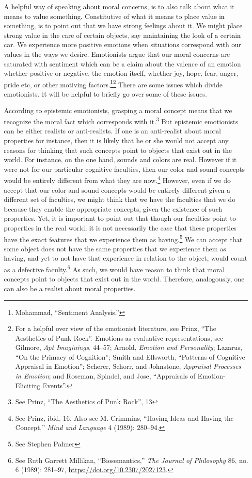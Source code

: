 \documentclass[phdthesis,12pt,final,a4paper]{wuthesis}
\theoremstyle{definition}
\theoremstyle{definition}
\theoremstyle{definition}
\theoremstyle{definition}
\theoremstyle{remark}
\begin{document}
A helpful way of speaking about moral concerns, is to also talk about what it means to value something. Constitutive of what it means to place value in something, is to point out that we have strong feelings about it. We might place strong value in the care of certain objects, say maintaining the look of a certain car. We experience more positive emotions when situations correspond with our values in the ways we desire. Emotionists argue that our moral concerns are saturated with sentiment which can be a claim about the valence of an emotion whether positive or negative, the emotion itself, whether joy, hope, fear, anger, pride etc, or other motiving factors.\footnote{Mohammad, {``Sentiment {Analysis}.''}}\footnote{For a helpful over view of the emotionist literature, see Prinz, {``The {Aesthetics} of {Punk Rock}''}. Emotions as evaluative representations, see Gilmore, \emph{Apt {Imaginings}}, 44--57; Arnold, \emph{Emotion and {Personality}}; Lazarus, {``On the {Primacy} of {Cognition}''}; Smith and Ellsworth, {``Patterns of {Cognitive Appraisal} in {Emotion}''}; Scherer, Schorr, and Johnstone, \emph{Appraisal Processes in Emotion}; and Roseman, Spindel, and Jose, {``Appraisals of Emotion-Eliciting Events''}.} There are some issues which divide emotionists. It will be helpful to briefly go over some of these issues.

According to epistemic emotionists, grasping a moral concept means that we recognize the moral fact which corresponds with it.\footnote{See Prinz, {``The {Aesthetics} of {Punk Rock}''}, 13} But epistemic emotionists can be either realists or anti-realists. If one is an anti-realist about moral properties for instance, then it is likely that he or she would not accept any reasons for thinking that such concepts point to objects that exist out in the world. For instance, on the one hand, sounds and colors are real. However if it were not for our particular cognitive faculties, then our color and sound concepts would be entirely different from what they are now.\footnote{See Prinz, ibid, 16. Also see M. Crimmins, {``Having Ideas and Having the Concept,''} \emph{Mind and Language} 4 (1989): 280--94.} However, even if we do accept that our color and sound concepts would be entirely different given a different set of faculties, we might think that we have the faculties that we do because they enable the appropriate concepts, given the existence of such properties. Yet, it is important to point out that though our faculties point to properties in the real world, it is not necessarily the case that these properties have the exact features that we experience them as having.\footnote{See Stephen Palmer} We can accept that some object does not have the same properties that we experience them as having, and yet to not have that experience in relation to the object, would count as a defective faculty.\footnote{See Ruth Garrett Millikan, {``Biosemantics,''} \emph{The Journal of Philosophy} 86, no. 6 (1989): 281--97, \url{https://doi.org/10.2307/2027123}.} As such, we would have reason to think that moral concepts point to objects that exist out in the world. Therefore, analogously, one can also be a realist about moral properties.
\end{document}
